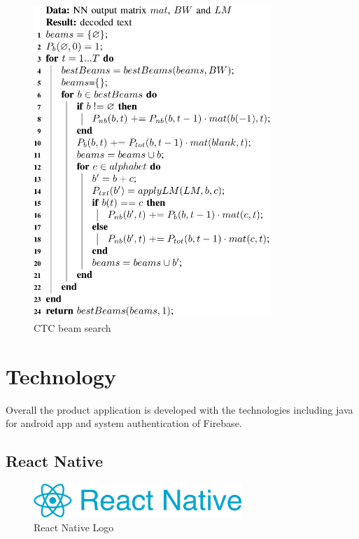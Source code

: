 \begin{figure}[H]
	\centering
	\includegraphics[width=0.8\textwidth]{img/Chap3/BS_CTC}
	\caption{ CTC beam search }
	\label{fig:Chap3-BS_CTC}
\end{figure}

\newpage
\section{Technology}
Overall the product application is developed with the technologies including java for android app and system authentication of Firebase.

\subsection{React Native}

\begin{figure}[H]
	\centering
	\includegraphics[width=0.7\textwidth]{img/technology/ReactNative.png}
	\caption{React Native Logo}
	\label{fig:ReactNativeLogo}
\end{figure}

